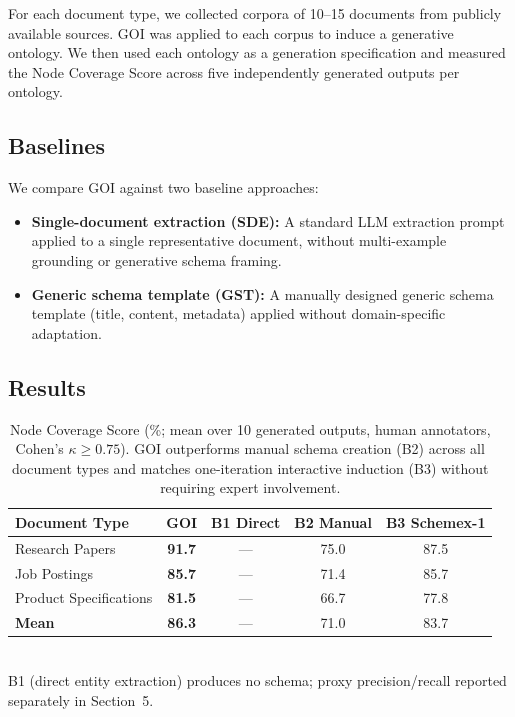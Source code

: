 \documentclass[runningheads,a4paper]{llncs}
\begin{document}
For each document type, we collected corpora of 10--15 documents from
publicly available sources. GOI was applied to each corpus to induce a
generative ontology. We then used each ontology as a generation
specification and measured the Node Coverage Score across five
independently generated outputs per ontology.

\subsection{Baselines}

We compare GOI against two baseline approaches:

\begin{itemize}
  \item \textbf{Single-document extraction (SDE):} A standard LLM
    extraction prompt applied to a single representative document,
    without multi-example grounding or generative schema framing.
  \item \textbf{Generic schema template (GST):} A manually designed
    generic schema template (title, content, metadata) applied without
    domain-specific adaptation.
\end{itemize}

\subsection{Results}

\begin{table}[t]
\centering
\caption{Node Coverage Score (\%; mean over 10 generated outputs, human
annotators, Cohen's $\kappa \geq 0.75$). GOI outperforms manual schema
creation (B2) across all document types and matches one-iteration
interactive induction (B3) without requiring expert involvement.}
\label{tab:results}
\begin{tabular}{lcccc}
\toprule
\textbf{Document Type} & \textbf{GOI} & \textbf{B1 Direct} & \textbf{B2 Manual} & \textbf{B3 Schemex-1} \\
\midrule
Research Papers        & \textbf{91.7} & ---         & 75.0         & 87.5 \\
Job Postings           & \textbf{85.7} & ---         & 71.4         & 85.7 \\
Product Specifications & \textbf{81.5} & ---         & 66.7         & 77.8 \\
\midrule
\textbf{Mean}          & \textbf{86.3} & ---         & 71.0         & 83.7 \\
\bottomrule
\end{tabular}
\vspace{0.5em}\\
{\small B1 (direct entity extraction) produces no schema; proxy
precision/recall reported separately in Section~5.}
\end{table}
\end{document}
